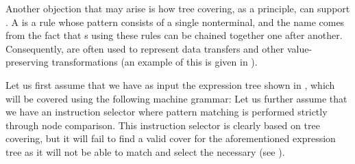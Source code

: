 {Another objection that may arise is how \gls{tree covering}, as a
\gls{principle}, can support \tchainRules.
%
A \tchainRule is a \gls{rule} whose
\gls{pattern} consists of a single \gls{nonterminal}, and the name comes from
the fact that s using these \glspl{rule} can be chained
together one after another.
%
Consequently, \tchainRules are often used to
represent data transfers and other value-preserving transformations (an example
of this is given in ).

Let us first assume that we have as input the \gls{expression tree} shown in
, which will be covered using the
following \gls{machine grammar}:
Let us further assume that we have an \gls{instruction selector}
where \gls{pattern matching} is performed strictly through \gls{node}
comparison.
%
This \gls{instruction selector} is clearly based on \gls{tree
covering}, but it will fail to find a valid cover for the
aforementioned \gls{expression tree} as it will not be able to match and select the
necessary \tchainRules (see
).


}
